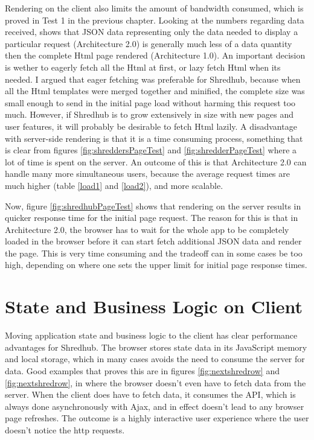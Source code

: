 Rendering on the client also limits the amount of bandwidth consumed, which is proved in Test 1 in the previous chapter. Looking at the numbers regarding data received, shows that JSON data representing only the data needed to display a particular request (Architecture 2.0) is generally much less of a data quantity then the complete Html page rendered (Architecture 1.0). An important decision is wether to eagerly fetch all the Html at first, or lazy fetch Html when its needed. I argued that eager fetching was preferable for Shredhub, because when all the Html templates were merged together and minified, the complete size was small enough to send in the initial page load without harming this request too much. However, if Shredhub is to grow extensively in size with new pages and user features, it will probably be desirable to fetch Html lazily. 
A disadvantage with server-side rendering is that it is a time consuming process, something that is clear from figures \vref{fig:shreddersPageTest} and \vref{fig:shredderPageTest} where a lot of time is spent on the server. An outcome of this is that Architecture 2.0 can handle many more simultaneous users, because the average request times are much higher (table \vref{load1} and \vref{load2}), and more scalable.  

Now, figure \vref{fig:shredhubPageTest} shows that rendering on the server results in quicker response time for the initial page request. The reason for this is that in Architecture 2.0, the browser has to wait for the whole app to be completely loaded in the browser before it can start fetch additional JSON data and render the page. This is very time consuming and the tradeoff can in some cases be too high, depending on where one sets the upper limit for initial page response times. 

\section{State and Business Logic on Client}
Moving application state and business logic to the client has clear performance advantages for Shredhub. The browser stores state data in its JavaScript memory and local storage, which in many cases avoids the need to consume the server for data. Good  examples that proves this are in figures \vref{fig:nextshredrow} and \vref{fig:nextshredrow}, in where the browser doesn't even have to fetch data from the server. When the client does have to fetch data, it consumes the API, which is always done asynchronously with Ajax, and in effect doesn't lead to any browser page refreshes. The outcome is a highly interactive user experience where the user doesn't notice the http requests.

